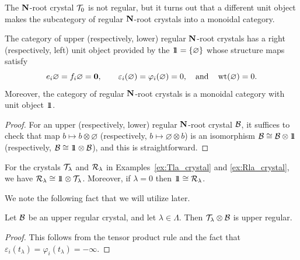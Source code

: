 \documentclass[11pt]{article}
\begin{document}
The $\mathbf{N}$-root crystal $\mathcal{T}_0$ is not regular, but it turns out that a different unit object makes the subcategory of regular $\mathbf{N}$-root crystals into a monoidal category.

\begin{proposition}
\label{prop:trivial_crystal}
The category of upper (respectively, lower) regular $\mathbf{N}$-root crystals has a right (respectively, left) unit object provided by the  $\one = \{\varnothing\}$ whose structure maps satisfy
\[
e_i \varnothing = f_i \varnothing = \boldsymbol{0},
\qquad
\varepsilon_i(\varnothing) = \varphi_i(\varnothing) = 0,
\quad\text{and}\quad 
\operatorname{wt}(\varnothing) = 0.
\]
Moreover, the category of regular $\mathbf{N}$-root crystals is a monoidal category with unit object $\one$.
\end{proposition}

\begin{proof}
For an upper (respectively, lower) regular $\mathbf{N}$-root crystal $\mathcal{B}$, it suffices to check that map $b\mapsto  b\otimes \varnothing$ (respectively, $b\mapsto \varnothing \otimes b$) is an isomorphism $\cB\iso \cB \otimes \one$ (respectively, $\cB\iso \one \otimes \cB$), and this is straightforward.
\end{proof}

\begin{example}
\label{ex:R=CT}
For the crystals $\mathcal{T}_{\lambda}$ and $\mathcal{R}_{\lambda}$ in Examples~\ref{ex:Tla_crystal} and \ref{ex:Rla_crystal}, we have $\cR_{\lambda} \iso \one \otimes \cT_{\lambda}$.
Moreover, if $\lambda = 0$ then $\one \iso \cR_\lambda$. 
\end{example}

We note the following fact that we will utilize later.

\begin{lemma}
\label{lemma:T_upper_prod}
Let $\mathcal{B}$ be an upper regular crystal, and let $\lambda \in \Lambda$.
Then
$
\mathcal{T}_{\lambda} \otimes \mathcal{B}
$
is upper regular.
\end{lemma}

\begin{proof}
This follows from the tensor product rule and the fact that $\varepsilon_i(t_{\lambda})  = \varphi_i(t_{\lambda}) = -\infty$.
\end{proof}









\end{document}
